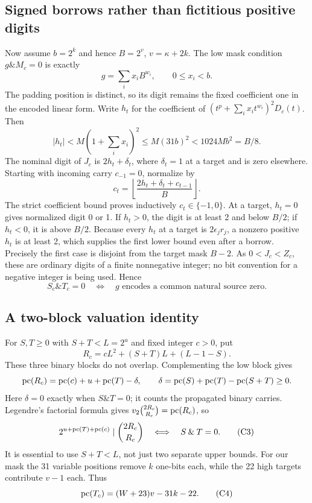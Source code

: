 \subsection{Signed borrows rather than fictitious positive digits}
Now assume $b=2^k$ and hence $B=2^v$, $v=\kappa+2k$.
The low mask condition $g\mathbin{\&}M_c=0$ is exactly
\[
 g=\sum_i x_iB^{w_i},\qquad 0\le x_i<b.
\]
The padding position is distinct, so its digit remains the fixed coefficient
one in the encoded linear form. Write $h_t$ for the coefficient of
$(t^p+\sum_i x_it^{w_i})^2D_c(t)$. Then
\[
 |h_t|<M(1+\sum_i x_i)^2\le M(31b)^2<1024Mb^2=B/8.
\]
The nominal digit of $J_c$ is $2h_t+\delta_t$, where $\delta_t=1$ at a
target and is zero elsewhere. Starting with incoming carry $c_{-1}=0$,
normalize by
\[
 c_t=\left\lfloor\frac{2h_t+\delta_t+c_{t-1}}{B}\right\rfloor.
\]
The strict coefficient bound proves inductively $c_t\in\{-1,0\}$.
At a target, $h_t=0$ gives normalized digit 0 or 1. If $h_t>0$, the
digit is at least 2 and below $B/2$; if $h_t<0$, it is above $B/2$.
Because every $h_t$ at a target is $2\epsilon_jr_j$, a nonzero positive
$h_t$ is at least 2, which supplies the first lower bound even after a
borrow. Precisely the first case is disjoint from the target mask $B-2$.
As $0<J_c<Z_c$, these are ordinary digits of a finite nonnegative integer;
no bit convention for a negative integer is being used. Hence
\[
 S_c\mathbin{\&}T_c=0
 \quad\Longleftrightarrow\quad
 g\text{ encodes a common natural source zero}.                \tag{C2}
\]

\subsection{A two-block valuation identity}
For $S,T\ge0$ with $S+T<L=2^u$ and fixed integer $c>0$, put
\[
 R_c=cL^2+(S+T)L+(L-1-S).
\]
These three binary blocks do not overlap. Complementing the low block gives
\[
 \operatorname{pc}(R_c)=\operatorname{pc}(c)+u+\operatorname{pc}(T)-\delta,\qquad
 \delta=\operatorname{pc}(S)+\operatorname{pc}(T)-\operatorname{pc}(S+T)\ge0.
\]
Here $\delta=0$ exactly when $S\mathbin{\&}T=0$; it counts the propagated
binary carries. Legendre's factorial formula gives
$v_2\binom{2R_c}{R_c}=\operatorname{pc}(R_c)$, so
\[
 2^{u+\operatorname{pc}(T)+\operatorname{pc}(c)}\mid\binom{2R_c}{R_c}
    \quad\Longleftrightarrow\quad S\mathbin{\&}T=0.       \tag{C3}
\]
It is essential to use $S+T<L$, not just two separate upper bounds.
For our mask the 31 variable positions remove $k$ one-bits each, while the
22 high targets contribute $v-1$ each. Thus
\[
 \operatorname{pc}(T_c)=(W+23)v-31k-22.                                \tag{C4}
\]

